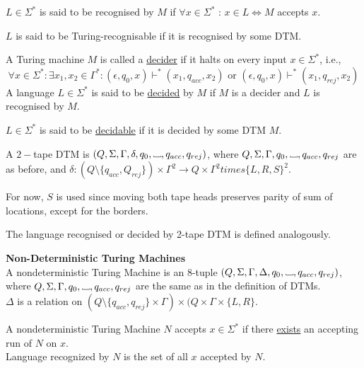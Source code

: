 \documentclass[a4paper]{article}
\newcommand{\nl}{\vspace{0.2cm}\\}
\newcommand{\changesto}{\vdash}
\newcommand\Vtextvisiblespace[1][.3em]{%
    \mbox{\kern.06em\vrule height.3ex}%
    \vbox{\hrule width#1}%
    \hbox{\vrule height.3ex}
}
\newcommand{\blank}{{\Vtextvisiblespace[0.7em]}}
\begin{document}
\begin{defn}
    $L \in \Sigma^*$ is said to be recognised by $M$ if $\forall x \in \Sigma^*$ : $x \in L \iff M$ accepts $x$.
\end{defn}

\begin{defn}
        $L$ is said to be Turing-recognisable if it is recognised by some DTM.
\end{defn}

\begin{defn}
        A Turing machine $M$ is called a \underline{decider} if it halts on every input $x \in \Sigma^*$, i.e.,
        \[
            \forall x \in \Sigma^* : \exists x_1, x_2 \in \Gamma^* : (\epsilon, q_0, x) \changesto^* (x_1, q_{acc}, x_2) \text{ or } (\epsilon, q_0, x) \changesto^* (x_1, q_{rej}, x_2)
        \]
        A language $L \in \Sigma^*$ is said to be \underline{decided}  by $M$ if $M$ is a decider and $L$ is recognised by $M$.
\end{defn}

\begin{defn}
        $L \in \Sigma^*$ is said to be \underline{decidable} if it is decided by some DTM $M$.
\end{defn}

\begin{defn}
        A $2-$tape DTM is $(Q, \Sigma, \Gamma, \delta, q_0, \blank, q_{acc}, q_{rej})$, where $Q, \Sigma, \Gamma, q_0, \blank, q_{acc}, q_{rej}$ are as before, and $\delta : (Q \setminus
        \{q_{acc}, Q_{rej}\}) \times \Gamma^2 \to Q \times \Gamma^2 times \{L, R, S\}^2$.
\end{defn}

For now, $S$ is used since moving both tape heads preserves parity of sum of locations, except for the borders.

The language recognised or decided by 2-tape DTM is defined analogously.

\begin{defn}
    \textbf{Non-Deterministic Turing Machines}\nl
    A nondeterministic Turing Machine is an 8-tuple $(Q, \Sigma, \Gamma, \Delta, q_0, \blank, q_{acc}, q_{rej})$, where $Q, \Sigma, \Gamma, q_0, \blank, q_{acc}, q_{rej}$ are the same as in the
    definition of DTMs.\nl
    $\Delta$ is a relation on $(Q \setminus \{q_{acc}, q_{rej}\} \times \Gamma) \times (Q \times \Gamma \times \{L, R\}$.
\end{defn}

\begin{defn}
    A nondeterministic Turing Machine $N$ accepts $x \in \Sigma^*$ if there \underline{exists} an accepting run of $N$ on $x$.\nl
    Language recognized by $N$ is the set of all $x$ accepted by $N$.
\end{defn}
\end{document}
